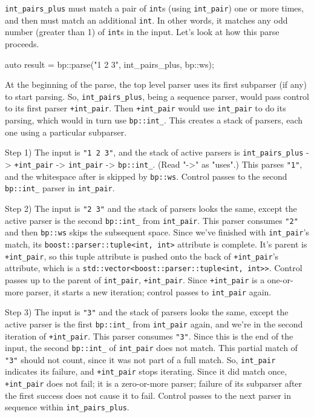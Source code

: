 \texttt{int\_pairs\_plus} must match a pair of \texttt{int}s (using \texttt{int\_pair}) one or more times, and then must match an additional \texttt{int}. In other words, it matches any odd number (greater than 1) of \texttt{int}s in the input. Let's look at how this parse proceeds.

\begin{code}
auto result = bp::parse("1 2 3", int_pairs_plus, bp::ws);
\end{code}

At the beginning of the parse, the top level parser uses its first subparser (if any) to start parsing. So, \texttt{int\_pairs\_plus}, being a sequence parser, would pass control to its first parser \texttt{+int\_pair}. Then \texttt{+int\_pair} would use \texttt{int\_pair} to do its parsing, which would in turn use \texttt{bp::int\_}. This creates a stack of parsers, each one using a particular subparser.

Step 1) The input is \texttt{"1 2 3"}, and the stack of active parsers is \texttt{int\_pairs\_plus} -> \texttt{+int\_pair} -> \texttt{int\_pair} -> \texttt{bp::int\_}. (Read "-\textgreater" as "uses".) This parses \texttt{"1"}, and the whitespace after is skipped by \texttt{bp::ws}. Control passes to the second \texttt{bp::int\_} parser in \texttt{int\_pair}.

Step 2) The input is \texttt{"2 3"} and the stack of parsers looks the same, except the active parser is the second \texttt{bp::int\_} from \texttt{int\_pair}. This parser consumes \texttt{"2"} and then \texttt{bp::ws} skips the subsequent space. Since we've finished with \texttt{int\_pair}'s match, its \texttt{boost::parser::tuple<int, int>} attribute is complete. It's parent is \texttt{+int\_pair}, so this tuple attribute is pushed onto the back of \texttt{+int\_pair}'s attribute, which is a \texttt{std::vector<boost::parser::tuple<int, int>>}. Control passes up to the parent of \texttt{int\_pair}, \texttt{+int\_pair}. Since \texttt{+int\_pair} is a one-or-more parser, it starts a new iteration; control passes to \texttt{int\_pair} again.

Step 3) The input is \texttt{"3"} and the stack of parsers looks the same, except the active parser is the first \texttt{bp::int\_} from \texttt{int\_pair} again, and we're in the second iteration of \texttt{+int\_pair}. This parser consumes \texttt{"3"}. Since this is the end of the input, the second \texttt{bp::int\_} of \texttt{int\_pair} does not match. This partial match of \texttt{"3"} should not count, since it was not part of a full match. So, \texttt{int\_pair} indicates its failure, and \texttt{+int\_pair} stops iterating. Since it did match once, \texttt{+int\_pair} does not fail; it is a zero-or-more parser; failure of its subparser after the first success does not cause it to fail. Control passes to the next parser in sequence within \texttt{int\_pairs\_plus}.

